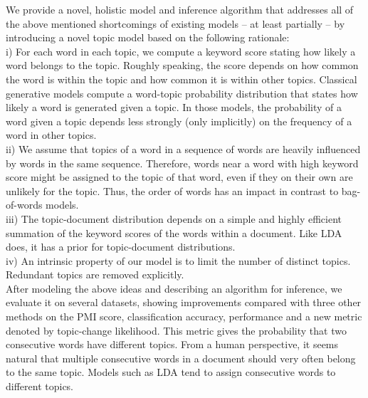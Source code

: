 \documentclass[twocolumn,10]{article}
\newcommand{\ci}{~\cite} \newcommand{\re}{~\ref} \newcommand{\ma}{\mathbb}
\begin{document}
	We provide a novel, holistic model and inference algorithm that addresses all of the above mentioned shortcomings of existing models -- at least partially -- by introducing a novel topic model based on the following rationale:\\
	\noindent i) For each word in each topic, we compute a keyword score stating how likely a word belongs to the topic. Roughly speaking, the score depends on how common the word is within the topic and how common it is within other topics. Classical generative models compute a word-topic probability distribution that states how likely a word is generated given a topic. In those models, the probability of a word given a topic depends less strongly (only implicitly) on the frequency of a word in other topics.\\
	\noindent ii) We assume that topics of a word in a sequence of words are heavily influenced by words in the same sequence. Therefore, words near a word with high keyword score might be assigned to the topic of that word, even if they on their own are unlikely for the topic. Thus, the order of words has an impact in contrast to bag-of-words models.\\
	\noindent iii) The topic-document distribution depends on a simple and highly efficient summation of the keyword scores of the words within a document. Like LDA does, it has a prior for topic-document distributions.\\
	\noindent iv) An intrinsic property of our model is to limit the number of distinct topics. Redundant topics are removed explicitly.\\
	After modeling the above ideas and describing an algorithm for inference, we evaluate it on several datasets, showing improvements compared with three other methods on the PMI score, classification accuracy, performance and a new metric denoted by topic-change likelihood. This metric gives the probability that two consecutive words have different topics. From a human perspective, it seems natural that multiple consecutive words in a document should very often belong to the same topic. Models such as LDA tend to assign consecutive words to different topics.%
	
\end{document}
